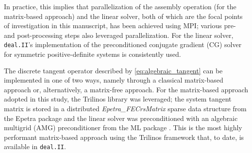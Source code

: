 \documentclass[AMA,STIX1COL]{WileyNJD-v2}
\begin{document}
In practice, this implies that parallelization of the assembly operation (for the matrix-based approach) and the linear solver, both of which are the focal points of investigation in this manuscript, has been achieved using MPI;
various pre- and post-processing steps also leveraged parallelization.
For the linear solver, \texttt{deal.II}'s implementation of the preconditioned conjugate gradient (CG) solver for symmetric positive-definite systems is consistently used.

The discrete tangent operator described by \eqref{eq:algebraic_tangent} can be implemented in one of two ways, namely through a classical matrix-based approach or, alternatively, a matrix-free approach.
For the matrix-based approach adopted in this study, the Trilinos \cite{Heroux2005} library was leveraged;
the system tangent matrix is stored in a distributed \textit{Epetra\_FECrsMatrix} sparse data structure from the Epetra package \cite{Heroux2005b} and the linear solver was preconditioned with an algebraic multigrid (AMG) preconditioner from the ML package \cite{Gee2006a}.
This is the most highly performant matrix-based approach using the Trilinos framework that, to date, is available in \texttt{deal.II}.
\end{document}
